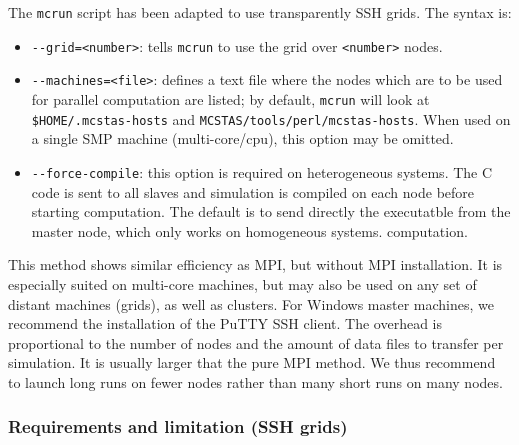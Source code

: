   The \verb'mcrun' script has been adapted to use transparently SSH grids. The syntax is:
\begin{itemize}
\item \verb'--grid=<number>': tells \verb'mcrun' to use the grid over \verb'<number>' nodes.
\item \verb'--machines=<file>': defines a text file where the
  nodes which are to be used for parallel computation are listed; by
  default, \verb'mcrun' will look at \verb'$HOME/.mcstas-hosts' and
  \verb'MCSTAS/tools/perl/mcstas-hosts'. When used on a single SMP machine 
  (multi-core/cpu), this option may be omitted.
\item \verb'--force-compile': this option is required on heterogeneous systems. 
  The C code is sent to all slaves and simulation is compiled on each node before 
  starting computation. The default is to send directly the executatble from the 
  master node, which only works on homogeneous systems.
  computation. 
\end{itemize}
  
  This method shows similar efficiency as MPI, but without MPI installation. It is 
  especially suited on multi-core machines, but may also be used on any set of distant 
  machines (grids), as well as clusters. For Windows master machines,
  we recommend the installation of the PuTTY SSH client. The overhead is proportional to
  the number of nodes and the amount of data files to transfer per simulation. It is 
  usually larger that the pure MPI method. We thus recommend to launch long runs on fewer nodes
  rather than many short runs on many nodes.
  
\subsubsection{Requirements and limitation (SSH grids)}

